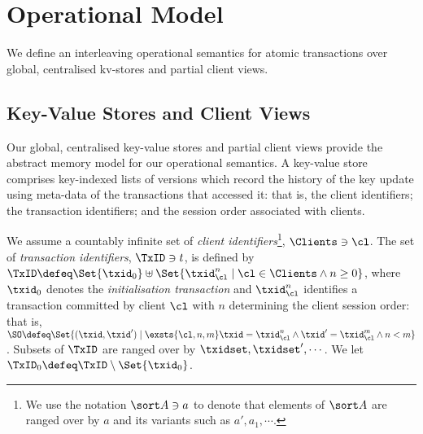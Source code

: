 \section{Operational Model}
\label{sec:model}

We define an interleaving operational semantics for atomic transactions over
global, centralised kv-stores and partial client views. 

\subsection{Key-Value Stores and Client Views}
\label{subsec:kvstores}
\label{sec:mkvs-view}
Our global, centralised key-value stores and partial client views
provide the abstract memory model for our operational semantics. A
key-value store comprises key-indexed lists of versions which record
the history of the key update using meta-data of the
transactions that accessed it: that is,  the client identifiers;
the transaction identifiers; and the session order associated with
clients. 





We assume a countably infinite set of \emph{client identifiers}\footnote{ We use the notation
 $\sort A \ni a$ to denote that elements of $\sort A$ are ranged over
  by $a$ and its variants such as $a', a_1, \cdots$.},
$\Clients \ni \cl$.
The set of \emph{transaction identifiers}, $\TxID \ni t$, 
 is defined by
$\TxID \defeq  \Set{\txid_{0}} \uplus \Set{ \txid_{\cl}^{n} \mid \cl
  \in \Clients \land n \geq 0 }$, 
where  $\txid_0$ denotes  the  \emph{initialisation transaction}
and $\txid_{\cl}^{n}$ identifies a transaction committed by client
$\cl$ with $n$  determining  the client session order: that is, $\SO \defeq \Set{ (\txid, \txid') \mid \exsts{ \cl, n,m } \txid =
\txid_{\cl}^{n} \land \txid' = \txid_{\cl}^{m} \land n < m}$.
Subsets of $\TxID$  are ranged over by $\txidset, \txidset', \cdots$. 
We let $\TxID_{0} \defeq \TxID \setminus \Set{\txid_0}$. 

